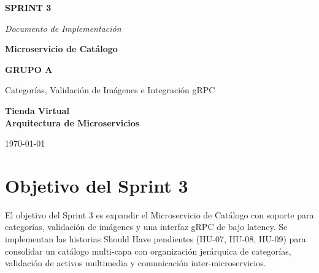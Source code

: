 \documentclass[12pt,a4paper]{article}
\begin{document}
\begin{titlepage}
  \pagecolor{primaryblue}\color{white}\centering\vspace*{2cm}
  {\fontsize{38}{46}\bfseries SPRINT 3\par}\vspace{0.5cm}
  {\fontsize{18}{24}\itshape Documento de Implementaci\'on\par}
  \vspace{1.5cm}
  \vspace{1.5cm}
  {\fontsize{26}{32}\bfseries Microservicio de Cat\'alogo\par}\vspace{0.3cm}
  {\fontsize{26}{32}\bfseries GRUPO A\par}\vspace{0.3cm}
  {\large Categor\'ias, Validaci\'on de Im\'agenes e Integraci\'on gRPC\par}
  \vspace{2cm}
  \begin{tcolorbox}[colback=white!15!primaryblue,colframe=white,width=10cm,halign=center]
    \centering\large\bfseries Tienda Virtual\\[0.3em]
    \normalsize Arquitectura de Microservicios
  \end{tcolorbox}
  \vfill{\large\today\par}
\end{titlepage}
\nopagecolor

\tableofcontents\newpage

\section{Objetivo del Sprint 3}

\begin{infobox}
El objetivo del Sprint 3 es expandir el Microservicio de Cat\'alogo con soporte para categor\'ias, validaci\'on de im\'agenes y una interfaz gRPC de bajo latency. Se implementan las historias Should Have pendientes (HU-07, HU-08, HU-09) para consolidar un cat\'alogo multi-capa con organizaci\'on jer\'arquica de categor\'ias, validaci\'on de activos multimedia y comunicaci\'on inter-microservicios.
\end{infobox}
\end{document}
